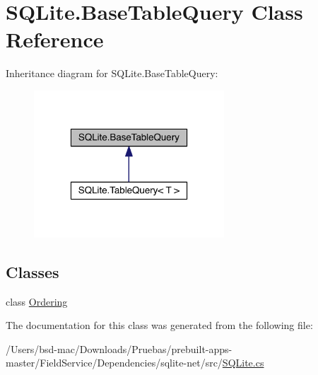 \hypertarget{class_s_q_lite_1_1_base_table_query}{\section{S\+Q\+Lite.\+Base\+Table\+Query Class Reference}
\label{class_s_q_lite_1_1_base_table_query}
}


Inheritance diagram for S\+Q\+Lite.\+Base\+Table\+Query\+:
\nopagebreak
\begin{figure}[H]
\begin{center}
\leavevmode
\includegraphics[width=202pt]{class_s_q_lite_1_1_base_table_query__inherit__graph}
\end{center}
\end{figure}
\subsection*{Classes}
\begin{DoxyCompactItemize}
\item 
class \hyperlink{class_s_q_lite_1_1_base_table_query_1_1_ordering}{Ordering}
\end{DoxyCompactItemize}


The documentation for this class was generated from the following file\+:\begin{DoxyCompactItemize}
\item 
/\+Users/bsd-\/mac/\+Downloads/\+Pruebas/prebuilt-\/apps-\/master/\+Field\+Service/\+Dependencies/sqlite-\/net/src/\hyperlink{_s_q_lite_8cs}{S\+Q\+Lite.\+cs}\end{DoxyCompactItemize}
